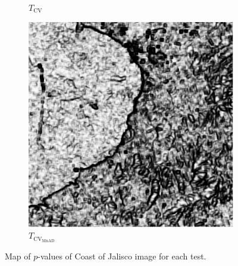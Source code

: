 \begin{figure}[H]
\begin{subfigure}[b]{0.3\textwidth}
    \caption{$T_\text{CV}$}
    \label{fig:Mexico_pvalue-2}
  \end{subfigure}
  \hfill
  \begin{subfigure}[b]{0.3\textwidth}
    \centering
    \includegraphics[width=\textwidth]{../../Figures/PNG/mnad_p_values_mexico_512}
     \caption{$T_{\text{CV}_{\text{MnAD}}}$}
    \label{fig:Mexico_pvalue-3}
  \end{subfigure}
  \caption{Map of $p$-values of Coast of Jalisco image for each test. }
  \label{fig:Mexico_pvalue}
\end{figure}




